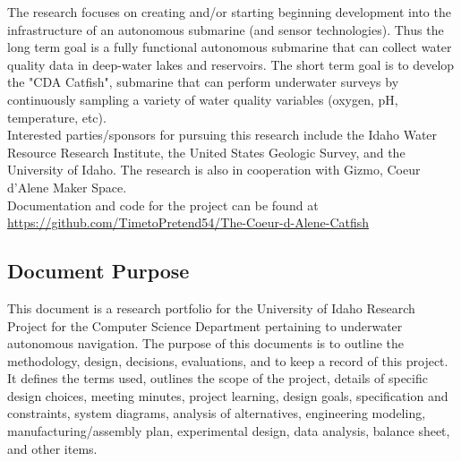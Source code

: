 \documentclass[12pt]{article}
\begin{document}
		The research focuses on creating and/or starting beginning development into the infrastructure of an autonomous submarine (and sensor technologies). Thus the long term goal is a fully functional autonomous submarine that can collect water quality data in deep-water lakes and reservoirs. The short term goal is to develop the "CDA Catfish", submarine that can perform underwater surveys by continuously sampling a variety of water quality variables (oxygen, pH, temperature, etc).\\
		Interested parties/sponsors for pursuing this research include the Idaho Water Resource Research Institute, the United States Geologic Survey, and the University of Idaho. The research is also in cooperation with Gizmo, Coeur d'Alene Maker Space.\\
		Documentation and code for the project can be found at \url{https://github.com/TimetoPretend54/The-Coeur-d-Alene-Catfish}
		
		\subsection{Document Purpose}
			This document is a research portfolio for the University of Idaho Research Project for the Computer Science Department pertaining to underwater autonomous navigation. The purpose of this documents is to outline the methodology, design, decisions, evaluations, and to keep a record of this project. It defines the terms used, outlines the scope of the project, details of specific design choices, meeting minutes, project learning, design goals, specification and constraints, system diagrams, analysis of alternatives, engineering modeling, manufacturing/assembly plan, experimental design, data analysis, balance sheet, and other items.
		
\end{document}
